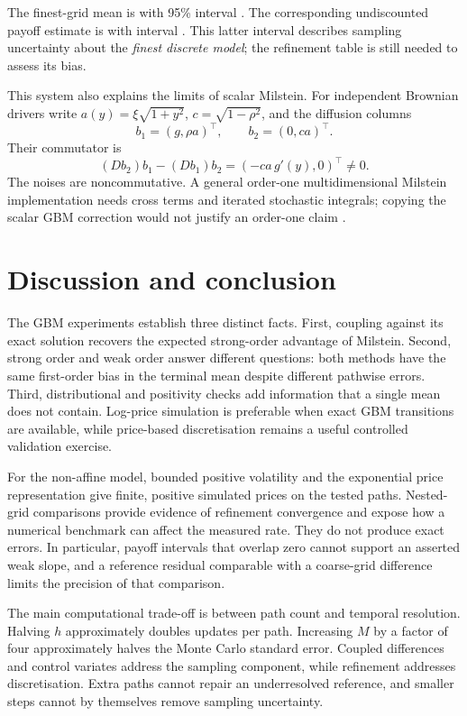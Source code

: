 \documentclass[11pt,a4paper]{article}
\begin{document}
The finest-grid mean is \NAExactMean{} with 95\% interval \NAExactMeanCI{}.
The corresponding undiscounted payoff estimate is \NAPayoff{} with interval \NAPayoffCI{}. This latter interval describes sampling uncertainty about the \emph{finest discrete model}; the refinement table is still needed to assess its bias.

This system also explains the limits of scalar Milstein. For independent Brownian drivers write $a(y)=\xi\sqrt{1+y^2}$, $c=\sqrt{1-\rho^2}$, and the diffusion columns
\begin{equation}
b_1=(g,\rho a)^\top,\qquad b_2=(0,ca)^\top .
\end{equation}
Their commutator is
\begin{equation}
(Db_2)b_1-(Db_1)b_2=(-ca\,g'(y),0)^\top\ne0.
\end{equation}
The noises are noncommutative. A general order-one multidimensional Milstein implementation needs cross terms and iterated stochastic integrals; copying the scalar GBM correction would not justify an order-one claim \cite{higham,kloeden}.

\newpage
\section{Discussion and conclusion}
The GBM experiments establish three distinct facts. First, coupling against its exact solution recovers the expected strong-order advantage of Milstein. Second, strong order and weak order answer different questions: both methods have the same first-order bias in the terminal mean despite different pathwise errors. Third, distributional and positivity checks add information that a single mean does not contain. Log-price simulation is preferable when exact GBM transitions are available, while price-based discretisation remains a useful controlled validation exercise.

For the non-affine model, bounded positive volatility and the exponential price representation give finite, positive simulated prices on the tested paths. Nested-grid comparisons provide evidence of refinement convergence and expose how a numerical benchmark can affect the measured rate. They do not produce exact errors. In particular, payoff intervals that overlap zero cannot support an asserted weak slope, and a reference residual comparable with a coarse-grid difference limits the precision of that comparison.

The main computational trade-off is between path count and temporal resolution. Halving $h$ approximately doubles updates per path. Increasing $M$ by a factor of four approximately halves the Monte Carlo standard error. Coupled differences and control variates address the sampling component, while refinement addresses discretisation. Extra paths cannot repair an underresolved reference, and smaller steps cannot by themselves remove sampling uncertainty.
\end{document}
